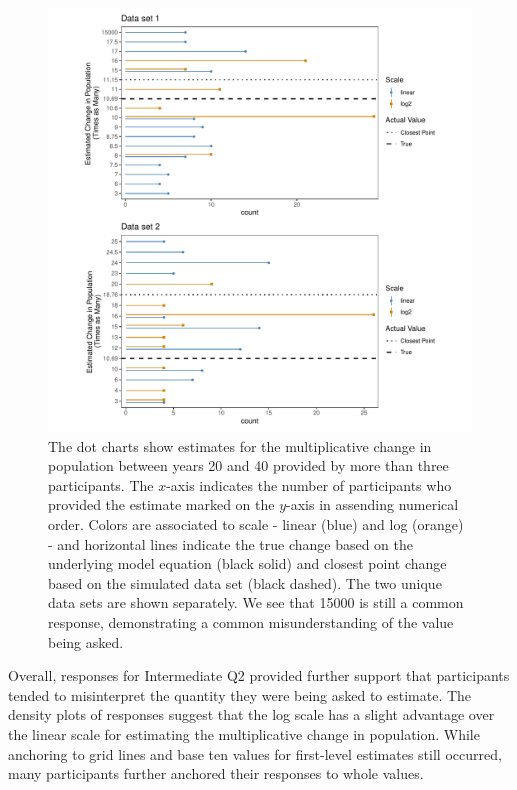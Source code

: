 \documentclass[print]{nuthesis}
\begin{document}
\begin{figure}[tbp]

{\centering \includegraphics[width=1\linewidth,]{thesis_files/figure-latex/qi2-common-responses-1} 

}

\caption[Intermediate Q2 common responses]{The dot charts show estimates for the multiplicative change in population between years 20 and 40 provided by more than three participants. The $x$-axis indicates the number of participants who provided the estimate marked on the $y$-axis in assending numerical order. Colors are associated to scale - linear (blue) and log (orange) - and horizontal lines indicate the true change based on the underlying model equation (black solid) and closest point change based on the simulated data set (black dashed). The two unique data sets are shown separately. We see that 15000 is still a common response, demonstrating a common misunderstanding of the value being asked.}\label{fig:qi2-common-responses}
\end{figure}

Overall, responses for Intermediate Q2 provided further support that participants tended to misinterpret the quantity they were being asked to estimate.
The density plots of responses suggest that the log scale has a slight advantage over the linear scale for estimating the multiplicative change in population.
While anchoring to grid lines and base ten values for first-level estimates still occurred, many participants further anchored their responses to whole values.
\end{document}
